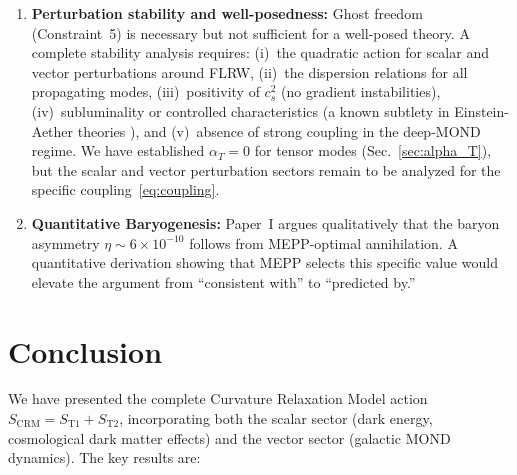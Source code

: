 \documentclass[aps,prd,twocolumn,superscriptaddress,nofootinbib]{revtex4-2}
\begin{document}
\begin{enumerate}
\item \textbf{Perturbation stability and well-posedness:} Ghost freedom (Constraint~5) is necessary but not sufficient for a well-posed theory. A complete stability analysis requires: (i)~the quadratic action for scalar and vector perturbations around FLRW, (ii)~the dispersion relations for all propagating modes, (iii)~positivity of $c_s^2$ (no gradient instabilities), (iv)~subluminality or controlled characteristics (a known subtlety in Einstein-Aether theories \cite{JacobsonMattingly2001}), and (v)~absence of strong coupling in the deep-MOND regime. We have established $\alpha_T = 0$ for tensor modes (Sec.~\ref{sec:alpha_T}), but the scalar and vector perturbation sectors remain to be analyzed for the specific coupling~\eqref{eq:coupling}.

\item \textbf{Quantitative Baryogenesis:} Paper~I argues qualitatively that the baryon asymmetry $\eta \sim 6 \times 10^{-10}$ follows from MEPP-optimal annihilation. A quantitative derivation showing that MEPP selects this specific value would elevate the argument from ``consistent with'' to ``predicted by.''
\end{enumerate}


\section{Conclusion}
\label{sec:conclusion}

We have presented the complete Curvature Relaxation Model action $S_{\mathrm{CRM}} = S_{\mathrm{T1}} + S_{\mathrm{T2}}$, incorporating both the scalar sector (dark energy, cosmological dark matter effects) and the vector sector (galactic MOND dynamics). The key results are:
\end{document}
